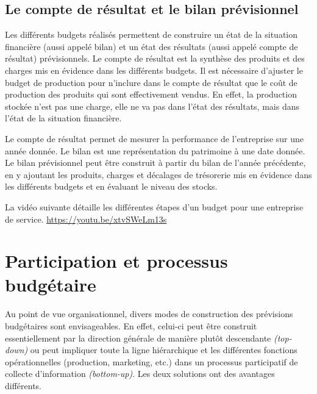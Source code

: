 \documentclass[oneside]{kaobook}
\begin{document}
\subsection{Le compte de résultat et le bilan prévisionnel}
\label{sec:org1d26ced}
Les différents budgets réalisés permettent de construire un état de la situation financière (aussi appelé bilan) et un état des résultats (aussi appelé compte de résultat) prévisionnels. Le compte de résultat est la synthèse des produits et des charges mis en évidence dans les différents budgets. Il est nécessaire d'ajuster le budget de production pour n'inclure dans le compte de résultat que le coût de production des produits qui sont effectivement vendus. En effet, la production stockée n'est pas une charge, elle ne va pas dans l'état des résultats, mais dans l'état de la situation financière.

Le compte de résultat permet de mesurer la performance de l'entreprise sur une année donnée. Le bilan est une représentation du patrimoine à une date donnée. Le bilan prévisionnel peut être construit à partir du bilan de l'année précédente, en y ajoutant les produits, charges et décalages de trésorerie mis en évidence dans les différents budgets et en évaluant le niveau des stocks. 

\begin{kaobox}
La vidéo suivante détaille les différentes étapes d'un budget pour une entreprise de service.
\url{https://youtu.be/xtvSWeLm13s}
\end{kaobox}

\section{Participation et processus budgétaire}
\label{sec:orgd2e8582}
Au point de vue organisationnel, divers modes de construction des prévisions budgétaires sont envisageables. En effet, celui-ci peut être construit essentiellement par la direction générale de manière plutôt descendante \emph{(top-down)} ou peut impliquer toute la ligne hiérarchique et les différentes fonctions opérationnelles (production, marketing, etc.) dans un processus participatif de collecte d'information \emph{(bottom-up)}. Les deux solutions ont des avantages différents.
\end{document}

